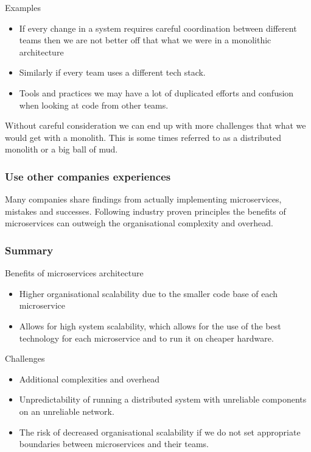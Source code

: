 Examples
\begin{itemize}
    \item If every change in a system requires careful coordination between different teams then we are not better off that what we were in a monolithic architecture
    \item Similarly if every team uses a different tech stack.
    \item Tools and practices we may have a lot of duplicated efforts and confusion when looking at code from other teams.
\end{itemize}

Without careful consideration we can end up with more challenges that what we would get with a monolith.
This is some times referred to as a distributed monolith or a big ball of mud.

\subsubsection{Use other companies experiences}
Many companies share findings from actually implementing microservices, mistakes and successes.
Following industry proven principles the benefits of microservices can outweigh the organisational complexity and overhead.

\subsubsection{Summary}
Benefits of microservices architecture

\begin{itemize}
    \item Higher organisational scalability due to the smaller code base of each microservice
    \item Allows for high system scalability, which allows for the use of the best technology for each microservice and to run it on cheaper hardware.
\end{itemize}

Challenges
\begin{itemize}
    \item Additional complexities and overhead
    \item Unpredictability of running a distributed system with unreliable components on an unreliable network.
    \item The risk of decreased organisational scalability if we do not set appropriate boundaries between microservices and their teams.
\end{itemize}


